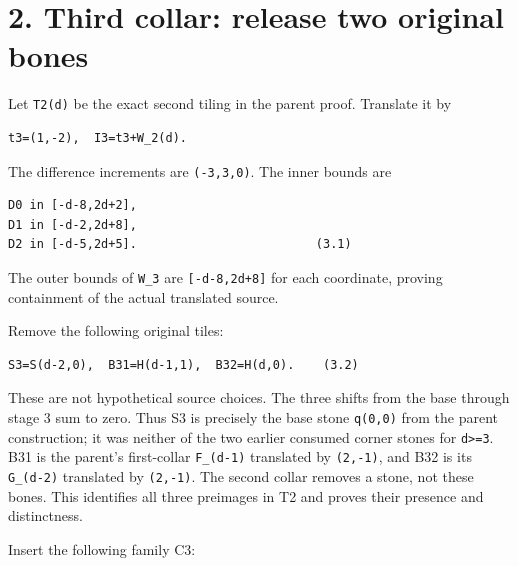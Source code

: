 \documentclass[
  10pt,
]{scrreprt}
\begin{document}
\section{2. Third collar: release two original
bones}\label{edition-6-section-2}

Let \texttt{T2(d)} be the exact second tiling in the parent proof.
Translate it by

\begin{verbatim}
t3=(1,-2),  I3=t3+W_2(d).
\end{verbatim}

The difference increments are \texttt{(-3,3,0)}. The inner bounds are

\begin{verbatim}
D0 in [-d-8,2d+2],
D1 in [-d-2,2d+8],
D2 in [-d-5,2d+5].                         (3.1)
\end{verbatim}

The outer bounds of \texttt{W\_3} are \texttt{{[}-d-8,2d+8{]}} for each
coordinate, proving containment of the actual translated source.

Remove the following original tiles:

\begin{verbatim}
S3=S(d-2,0),  B31=H(d-1,1),  B32=H(d,0).    (3.2)
\end{verbatim}

These are not hypothetical source choices. The three shifts from the
base through stage 3 sum to zero. Thus S3 is precisely the base stone
\texttt{q(0,0)} from the parent construction; it was neither of the two
earlier consumed corner stones for \texttt{d\textgreater{}=3}. B31 is
the parent's first-collar \texttt{F\_(d-1)} translated by
\texttt{(2,-1)}, and B32 is its \texttt{G\_(d-2)} translated by
\texttt{(2,-1)}. The second collar removes a stone, not these bones.
This identifies all three preimages in T2 and proves their presence and
distinctness.

Insert the following family C3:
\end{document}
